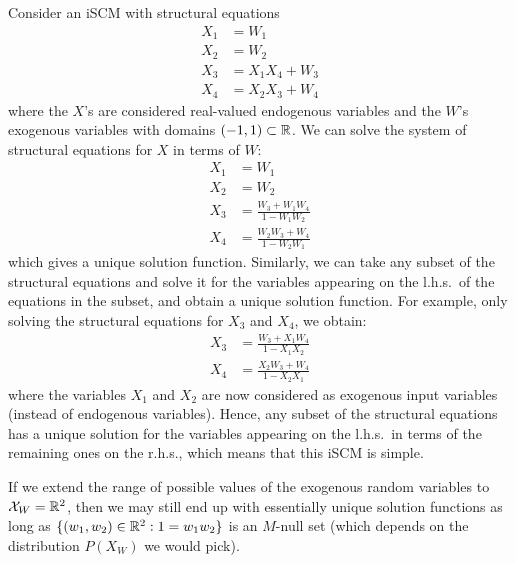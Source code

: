 \begin{Eg}\label{eg:simple_scm}
Consider an iSCM with structural equations
  \begin{align*}
    X_1 &= W_1 \\
    X_2 &= W_2 \\
    X_3 &= X_1 X_4 + W_3 \\
    X_4 &= X_2 X_3 + W_4 
  \end{align*}
where the $X$'s are considered real-valued endogenous variables and the $W$'s exogenous variables with domains $(-1,1) \subset \mathbb{R}$.
We can solve the system of structural equations for $X$ in terms of $W$:
  \begin{align*}
    X_1 &= W_1 \\
    X_2 &= W_2 \\
    X_3 &= \frac{W_3 + W_1 W_4}{1 - W_1 W_2} \\
    X_4 &= \frac{W_2 W_3 + W_4}{1 - W_2 W_1}
  \end{align*}
which gives a unique solution function.
Similarly, we can take any subset of the structural equations and solve it for the variables appearing on the l.h.s.\ of the equations in the subset, and obtain a unique solution function. 
For example, only solving the structural equations for $X_3$ and $X_4$, we obtain:
  \begin{align*}
    X_3 &= \frac{W_3 + X_1 W_4}{1 - X_1 X_2} \\
    X_4 &= \frac{X_2 W_3 + W_4}{1 - X_2 X_1}
  \end{align*}
where the variables $X_1$ and $X_2$ are now considered as exogenous input variables (instead of endogenous variables).
Hence, any subset of the structural equations has a unique solution for the variables appearing on the l.h.s.\ in terms of the remaining ones on the r.h.s., which means that this iSCM is simple.

If we extend the range of possible values of the exogenous random variables to $\mathcal{X}_W = \mathbb{R}^2$, then we may still end up with essentially unique solution functions as long as $\{(w_1,w_2) \in \mathbb{R}^2 : 1 = w_1 w_2\}$ is an $M$-null set (which depends on the distribution $P(X_W)$ we would pick).
\end{Eg}

